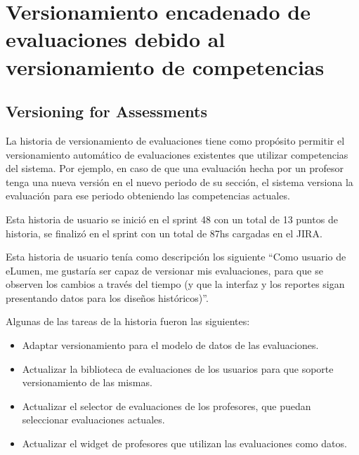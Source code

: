\section{Versionamiento encadenado de evaluaciones debido al versionamiento de competencias}
\subsection{Versioning for Assessments}
La historia de versionamiento de evaluaciones tiene como propósito permitir el versionamiento automático de evaluaciones existentes que utilizar competencias del sistema. Por ejemplo, en caso de que una evaluación hecha por un profesor tenga una nueva versión en el nuevo periodo de su sección, el sistema versiona la evaluación para ese periodo obteniendo las competencias actuales.

Esta historia de usuario se inició en el sprint 48 con un total de 13 puntos de historia, se finalizó en el sprint con un total de 87hs cargadas en el JIRA.

Esta historia de usuario tenía como descripción los siguiente “Como usuario de eLumen, me gustaría ser capaz de versionar mis evaluaciones, para que se observen los cambios a través del tiempo (y que la interfaz y los reportes sigan presentando datos para los diseños históricos)”.

Algunas de las tareas de la historia fueron las siguientes:
\begin{itemize}
	\item Adaptar versionamiento para el modelo de datos de las evaluaciones.
	\item Actualizar la biblioteca de evaluaciones de los usuarios para que soporte versionamiento de las mismas.
	\item Actualizar el selector de evaluaciones de los profesores, que puedan seleccionar evaluaciones actuales.
	\item Actualizar el widget de profesores que utilizan las evaluaciones como datos.
\end{itemize}

